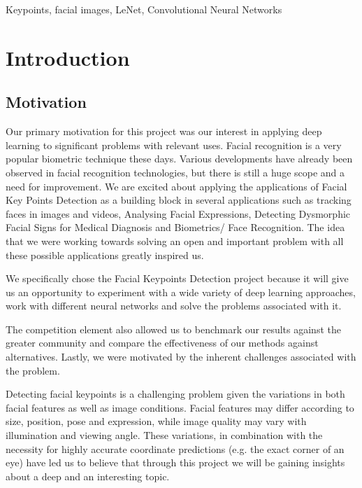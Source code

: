 \documentclass[conference]{IEEEtran}
\begin{document}
\begin{IEEEkeywords}
Keypoints, facial images, LeNet, Convolutional Neural Networks
\end{IEEEkeywords}

\section{Introduction}
\subsection{Motivation}
Our primary motivation for this project was our interest in applying deep learning to significant problems with relevant uses. Facial recognition is a very popular biometric technique these days. Various developments have already been observed in facial recognition technologies, but there is still a huge scope and a need for improvement. We are excited about applying the applications of Facial Key Points Detection as a building block in several applications such as tracking faces in images and videos, Analysing Facial Expressions, Detecting Dysmorphic Facial Signs for Medical Diagnosis and Biometrics/ Face Recognition. The idea that we were working towards solving an open and important problem with all these possible applications greatly inspired us.

We specifically chose the Facial Keypoints Detection project because it will give us an opportunity to experiment with a wide variety of deep learning approaches, work with different neural networks and solve the problems associated with it.

The competition element also allowed us to benchmark our results against the greater community and compare the effectiveness of our methods against alternatives. Lastly, we were motivated by the inherent challenges associated with the problem. 

Detecting facial keypoints is a challenging problem given the variations in both facial features as well as image conditions. Facial features may differ according to size, position, pose and expression, while image quality may vary with illumination and viewing angle. These variations, in combination with the necessity for highly accurate coordinate predictions (e.g. the exact corner of an eye) have led us to believe that through this project we will be gaining insights about a deep and an interesting topic.
\end{document}
